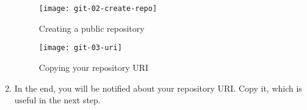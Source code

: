 \begin{enumerate}
\begin{figure}[t]
\centering
\texttt{[image: git-02-create-repo]}
\caption{Creating a public repository\label{git-02-create-repo}}
\end{figure}

\begin{figure}[t]
\centering
\texttt{[image: git-03-uri]}
\caption{Copying your repository URI\label{git-03-uri}}
\end{figure}

\item In the end, you will be notified about your repository URI. Copy it, which is useful in the next step.

\end{enumerate}

